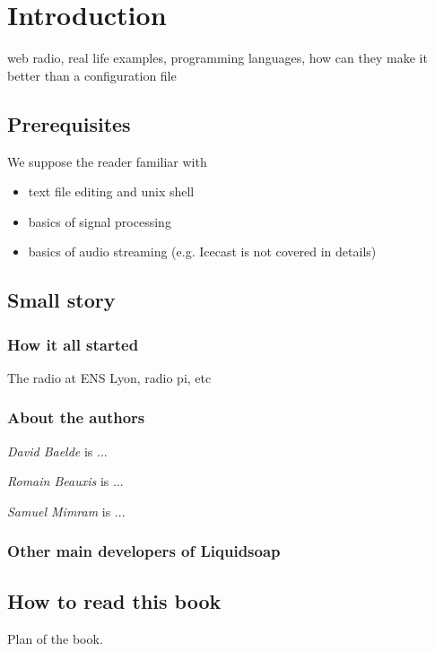 \chapter{Introduction}
web radio, real life examples, programming languages, how can they make it
better than a configuration file

\section{Prerequisites}
We suppose the reader familiar with
\begin{itemize}
\item text file editing and unix shell
\item basics of signal processing
\item basics of audio streaming (e.g. Icecast is not covered in details)
\end{itemize}

\section{Small story}
\subsection{How it all started}
The radio at ENS Lyon, radio pi, etc

\subsection{About the authors}
\emph{David Baelde} is ...

\emph{Romain Beauxis} is ...

\emph{Samuel Mimram} is ...

\subsection{Other main developers of Liquidsoap}

\section{How to read this book}
Plan of the book.